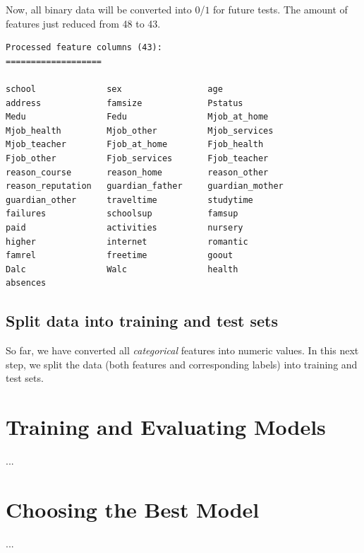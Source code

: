 \documentclass[a4paper]{article}
\begin{document}
Now, all binary data will be converted into $0$/$1$ for future tests. The amount of features just reduced from 48 to 43.

\begin{lstlisting}
Processed feature columns (43):
===================

school            	sex               	age               
address           	famsize           	Pstatus           
Medu              	Fedu              	Mjob_at_home      
Mjob_health       	Mjob_other        	Mjob_services     
Mjob_teacher      	Fjob_at_home      	Fjob_health       
Fjob_other        	Fjob_services     	Fjob_teacher      
reason_course     	reason_home       	reason_other      
reason_reputation 	guardian_father   	guardian_mother   
guardian_other    	traveltime        	studytime         
failures          	schoolsup         	famsup            
paid              	activities        	nursery           
higher            	internet          	romantic          
famrel            	freetime          	goout             
Dalc              	Walc              	health            
absences    
\end{lstlisting}

\subsection{Split data into training and test sets}
So far, we have converted all \textit{categorical} features into numeric values. In this next step, we split the data (both features and corresponding labels) into training and test sets.


\section{Training and Evaluating Models}
...

\section{Choosing the Best Model}
...





\end{document}
